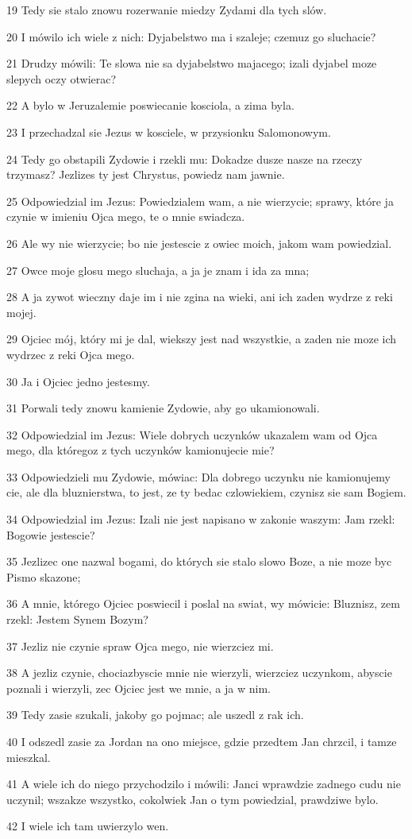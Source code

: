 \par 19 Tedy sie stalo znowu rozerwanie miedzy Zydami dla tych slów.
\par 20 I mówilo ich wiele z nich: Dyjabelstwo ma i szaleje; czemuz go sluchacie?
\par 21 Drudzy mówili: Te slowa nie sa dyjabelstwo majacego; izali dyjabel moze slepych oczy otwierac?
\par 22 A bylo w Jeruzalemie poswiecanie kosciola, a zima byla.
\par 23 I przechadzal sie Jezus w kosciele, w przysionku Salomonowym.
\par 24 Tedy go obstapili Zydowie i rzekli mu: Dokadze dusze nasze na rzeczy trzymasz? Jezlizes ty jest Chrystus, powiedz nam jawnie.
\par 25 Odpowiedzial im Jezus: Powiedzialem wam, a nie wierzycie; sprawy, które ja czynie w imieniu Ojca mego, te o mnie swiadcza.
\par 26 Ale wy nie wierzycie; bo nie jestescie z owiec moich, jakom wam powiedzial.
\par 27 Owce moje glosu mego sluchaja, a ja je znam i ida za mna;
\par 28 A ja zywot wieczny daje im i nie zgina na wieki, ani ich zaden wydrze z reki mojej.
\par 29 Ojciec mój, który mi je dal, wiekszy jest nad wszystkie, a zaden nie moze ich wydrzec z reki Ojca mego.
\par 30 Ja i Ojciec jedno jestesmy.
\par 31 Porwali tedy znowu kamienie Zydowie, aby go ukamionowali.
\par 32 Odpowiedzial im Jezus: Wiele dobrych uczynków ukazalem wam od Ojca mego, dla któregoz z tych uczynków kamionujecie mie?
\par 33 Odpowiedzieli mu Zydowie, mówiac: Dla dobrego uczynku nie kamionujemy cie, ale dla bluznierstwa, to jest, ze ty bedac czlowiekiem, czynisz sie sam Bogiem.
\par 34 Odpowiedzial im Jezus: Izali nie jest napisano w zakonie waszym: Jam rzekl: Bogowie jestescie?
\par 35 Jezlizec one nazwal bogami, do których sie stalo slowo Boze, a nie moze byc Pismo skazone;
\par 36 A mnie, którego Ojciec poswiecil i poslal na swiat, wy mówicie: Bluznisz, zem rzekl: Jestem Synem Bozym?
\par 37 Jezliz nie czynie spraw Ojca mego, nie wierzciez mi.
\par 38 A jezliz czynie, chociazbyscie mnie nie wierzyli, wierzciez uczynkom, abyscie poznali i wierzyli, zec Ojciec jest we mnie, a ja w nim.
\par 39 Tedy zasie szukali, jakoby go pojmac; ale uszedl z rak ich.
\par 40 I odszedl zasie za Jordan na ono miejsce, gdzie przedtem Jan chrzcil, i tamze mieszkal.
\par 41 A wiele ich do niego przychodzilo i mówili: Janci wprawdzie zadnego cudu nie uczynil; wszakze wszystko, cokolwiek Jan o tym powiedzial, prawdziwe bylo.
\par 42 I wiele ich tam uwierzylo wen.

